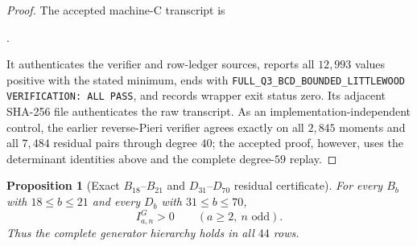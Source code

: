 \documentclass[11pt,reqno]{amsart}
\theoremstyle{plain}
\newtheorem{proposition}[theorem]{Proposition}
\theoremstyle{definition}
\begin{document}
\begin{proof}
The accepted machine-C transcript is
\begin{center}
.
\end{center}
It authenticates the verifier and row-ledger sources, reports all
$12{,}993$ values positive with the stated minimum, ends with
\texttt{FULL\_Q3\_BCD\_BOUNDED\_LITTLEWOOD VERIFICATION: ALL PASS}, and
records wrapper exit status zero.  Its adjacent SHA-256 file authenticates
the raw transcript.  As an implementation-independent control, the earlier
reverse-Pieri verifier agrees exactly on all $2{,}845$ moments and all
$7{,}484$ residual pairs through degree $40$; the accepted proof, however,
uses the determinant identities above and the complete degree-$59$ replay.
\end{proof}

\begin{proposition}[Exact $B_{18}$--$B_{21}$ and
$D_{31}$--$D_{70}$ residual certificate]
\label{prop:bd-finite-residual-certificate}
For every $B_b$ with $18\leq b\leq21$ and every $D_b$ with
$31\leq b\leq70$,
\[
 I^G_{a,n}>0\qquad(a\geq2,\ n\text{ odd}).
\]
Thus the complete generator hierarchy holds in all $44$ rows.
\end{proposition}
\end{document}
